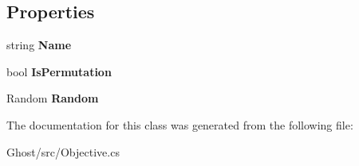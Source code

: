 \subsection*{Properties}
\begin{DoxyCompactItemize}
\item 
\hypertarget{classghost_1_1Objective_3_01TypeSetVariables_00_01TypeVariable_01_4_a7613aecfe171eb9aa6f3b77ccdbe49be}{string {\bfseries Name}}\label{classghost_1_1Objective_3_01TypeSetVariables_00_01TypeVariable_01_4_a7613aecfe171eb9aa6f3b77ccdbe49be}

\item 
\hypertarget{classghost_1_1Objective_3_01TypeSetVariables_00_01TypeVariable_01_4_ae27cf3769e4705f74e22a32604982375}{bool {\bfseries Is\-Permutation}}\label{classghost_1_1Objective_3_01TypeSetVariables_00_01TypeVariable_01_4_ae27cf3769e4705f74e22a32604982375}

\item 
\hypertarget{classghost_1_1Objective_3_01TypeSetVariables_00_01TypeVariable_01_4_ad1ab2a8ba444cebdf8a9e7ee692731b4}{Random {\bfseries Random}}\label{classghost_1_1Objective_3_01TypeSetVariables_00_01TypeVariable_01_4_ad1ab2a8ba444cebdf8a9e7ee692731b4}

\end{DoxyCompactItemize}


The documentation for this class was generated from the following file\-:\begin{DoxyCompactItemize}
\item 
Ghost/src/Objective.\-cs\end{DoxyCompactItemize}
